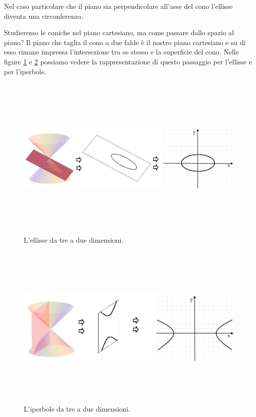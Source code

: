 Nel caso particolare che il piano sia perpendicolare all'asse del cono 
l'ellisse diventa una circonferenza. 

Studieremo le coniche nel piano cartesiano, ma come passare dallo spazio al 
piano? Il piano che taglia il cono a due falde è il nostro piano cartesiano e 
su di esso rimane impressa l'intersezione tra se stesso e la superficie del 
cono. Nelle figure \ref{fig:ellissedalcono} e \ref{fig:iperbolepiano} possiamo 
vedere la rappresentazione di questo passaggio per l'ellisse e per l'iperbole. 

\begin{figure}[htbp]
\centering%
\includegraphics[height=8cm, width=14cm, keepaspectratio] 
{img/ellissedalcono.jpg}
\caption{L'ellisse da tre a due dimensioni.}
\label{fig:ellissedalcono}
\end{figure}

\begin{figure}[htbp]
\centering%
\includegraphics[height=8cm, width=14cm, keepaspectratio] 
{img/iperbolepiano.jpg}%
\caption{L'iperbole da tre a due dimensioni.}%
\label{fig:iperbolepiano}
\end{figure}

